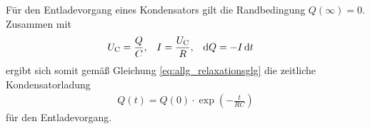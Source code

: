 \noindent
Für den Entladevorgang eines Kondensators gilt die Randbedingung $Q(\infty) = 0$.
Zusammen mit 
\begin{align*}
    U_\text{C} &= \frac{Q}{C}, & I &= \frac{U_\text{C}}{R}, & \mathop{}\!\mathrm{d}{Q} &= - I \mathop{}\!\mathrm{d}{t}
\end{align*}
ergibt sich somit gemäß Gleichung \eqref{eq:allg_relaxationsglg} die zeitliche Kondensatorladung
\begin{align}
    Q(t) = Q(0) \cdot \exp\left(- \frac{t}{RC}\right)
    \label{eq:entladung}
\end{align}
für den Entladevorgang.
